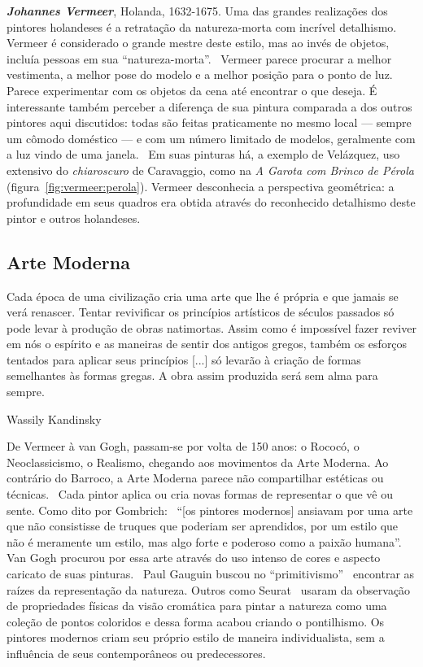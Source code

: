 \textbf{\emph{Johannes Vermeer}}, Holanda, 1632-1675. Uma das grandes realizações dos
pintores holandeses é a retratação da natureza-morta com incrível
detalhismo.~\cite{wadum} Vermeer é considerado o grande mestre deste
estilo, mas ao invés de objetos, incluía pessoas em sua
``natureza-morta''.~\cite{gombrich} Vermeer parece procurar a melhor
vestimenta, a melhor pose do modelo e a melhor posição para o ponto de
luz. Parece experimentar com os objetos da cena até encontrar o que
deseja. É interessante também perceber a diferença de sua pintura
comparada a dos outros pintores aqui discutidos: todas são feitas
praticamente no mesmo local --- sempre um cômodo doméstico --- e com
um número limitado de modelos, geralmente com a luz vindo de uma
janela.~\cite{wadum1998}  Em suas pinturas há, a exemplo de Velázquez,
uso extensivo do \textit{chiaroscuro} de Caravaggio, como na \textit{A
Garota com Brinco de Pérola}
(figura~\ref{fig:vermeer:perola}). Vermeer desconhecia a perspectiva
geométrica: a profundidade em seus quadros era obtida através do
reconhecido detalhismo deste pintor e outros holandeses.



\subsection{Arte Moderna}

\setlength{\epigraphwidth}{0.8\textwidth}
\epigraph{Cada época de uma civilização cria uma arte que lhe é própria e que
  jamais se verá renascer. Tentar revivificar os princípios artísticos de
  séculos passados só pode levar à produção de obras natimortas. Assim como é
  impossível fazer reviver em nós o espírito e as maneiras de sentir dos antigos
  gregos, também os esforços tentados para aplicar seus princípios [...] só
  levarão à criação de formas semelhantes às formas gregas. A obra assim
  produzida será sem alma para sempre.}{Wassily Kandinsky~\cite{kandinsky}}

De Vermeer à van Gogh, passam-se por volta de 150 anos: o Rococó, o
Neoclassicismo, o Realismo, chegando aos movimentos da Arte
Moderna. Ao contrário do Barroco, a Arte Moderna parece não
compartilhar estéticas ou técnicas.~\cite{dempsey} Cada pintor aplica
ou cria novas formas de representar o que vê ou sente. Como dito por
Gombrich:~\cite{gombrich} ``[os pintores modernos] ansiavam por uma
arte que não consistisse de truques que poderiam ser aprendidos, por
um estilo que não é meramente um estilo, mas algo forte e poderoso
como a paixão humana''. Van Gogh procurou por essa arte através do uso
intenso de cores e aspecto caricato de suas pinturas.~\cite{hulsker}
Paul Gauguin buscou no ``primitivismo''~\cite{lovejoy} encontrar as
raízes da representação da natureza. Outros como Seurat~\cite{kemp}
usaram da observação de propriedades físicas da visão cromática para
pintar a natureza como uma coleção de pontos coloridos e dessa forma
acabou criando o pontilhismo. Os pintores modernos criam seu próprio
estilo de maneira individualista, sem a influência de seus
contemporâneos ou predecessores.~\cite{gombrich}

